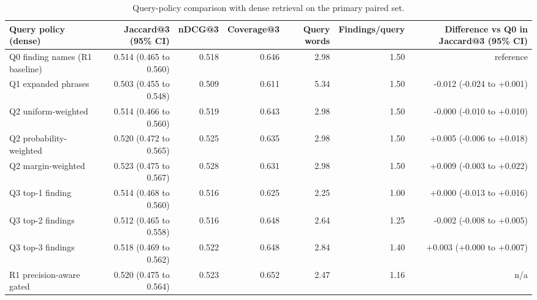 \begin{table}[t]
\centering
\scriptsize
\begin{tabular}{lrrrrrr}
\hline
Query policy (dense) & Jaccard@3 (95\% CI) & nDCG@3 & Coverage@3 & Query words & Findings/query & Difference vs Q0 in Jaccard@3 (95\% CI) \\
\hline
Q0 finding names (R1 baseline) & 0.514 (0.465 to 0.560) & 0.518 & 0.646 & 2.98 & 1.50 & reference \\
Q1 expanded phrases & 0.503 (0.455 to 0.548) & 0.509 & 0.611 & 5.34 & 1.50 & -0.012 (-0.024 to +0.001) \\
Q2 uniform-weighted & 0.514 (0.466 to 0.560) & 0.519 & 0.643 & 2.98 & 1.50 & -0.000 (-0.010 to +0.010) \\
Q2 probability-weighted & 0.520 (0.472 to 0.565) & 0.525 & 0.635 & 2.98 & 1.50 & +0.005 (-0.006 to +0.018) \\
Q2 margin-weighted & 0.523 (0.475 to 0.567) & 0.528 & 0.631 & 2.98 & 1.50 & +0.009 (-0.003 to +0.022) \\
Q3 top-1 finding & 0.514 (0.468 to 0.560) & 0.516 & 0.625 & 2.25 & 1.00 & +0.000 (-0.013 to +0.016) \\
Q3 top-2 findings & 0.512 (0.465 to 0.558) & 0.516 & 0.648 & 2.64 & 1.25 & -0.002 (-0.008 to +0.005) \\
Q3 top-3 findings & 0.518 (0.469 to 0.562) & 0.522 & 0.648 & 2.84 & 1.40 & +0.003 (+0.000 to +0.007) \\
R1 precision-aware gated & 0.520 (0.475 to 0.564) & 0.523 & 0.652 & 2.47 & 1.16 & n/a \\
\hline
\end{tabular}
\caption{Query-policy comparison with dense retrieval on the primary paired set.}
\label{tab:table1_query_policy_comparison}
\end{table}
